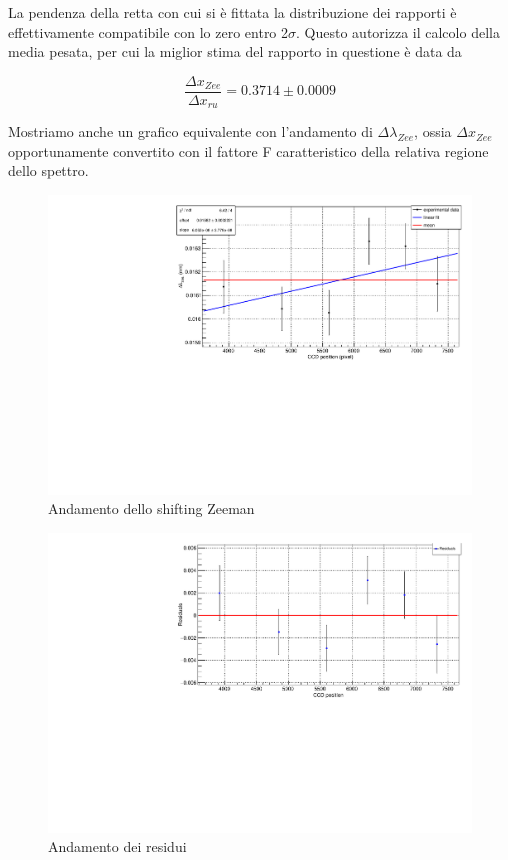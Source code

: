 \documentclass{article}
\begin{document}
	La pendenza della retta con cui si è fittata la distribuzione dei rapporti è effettivamente
	compatibile con lo zero entro 2$\sigma$. Questo autorizza il calcolo della media pesata, per cui 
	la miglior stima del rapporto in questione è data da 

	\[
		\frac{\Delta x_{Zee}}{\Delta x_{ru}} = 0.3714 \pm 0.0009	
	\]

	Mostriamo anche un grafico equivalente con l'andamento di $\Delta\lambda_{Zee}$, ossia 
	$\Delta x_{Zee}$ opportunamente convertito con il fattore F caratteristico della relativa regione
	dello spettro.

	\begin{center}
		\begin{figure}[H]
			\centering
			\includegraphics[scale=0.38, angle=0]{campomax/dlambdazee.pdf}
			\caption{Andamento dello shifting Zeeman}
			\label{fig:fit_dlambdazee}
		\end{figure}
	\end{center}

	\begin{center}
		\begin{figure}[H]
			\centering
			\includegraphics[scale=0.38, angle=0]{campomax/residuals.pdf}
			\caption{Andamento dei residui}
			\label{fig:fit_dlambdazee_res}
		\end{figure}
	\end{center}
\end{document}
